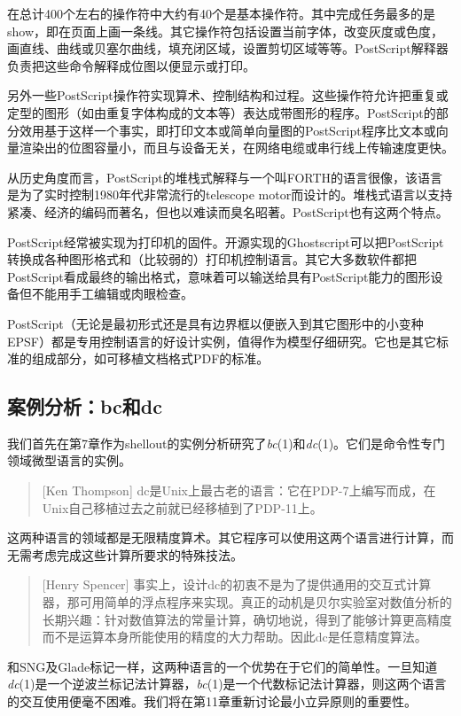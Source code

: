 \documentclass[12pt,oneside]{book}
\begin{document}
在总计400个左右的操作符中大约有40个是基本操作符。其中完成任务最多的是show，即在页面上画一条线。其它操作符包括设置当前字体，改变灰度或色度，画直线、曲线或贝塞尔曲线，填充闭区域，设置剪切区域等等。PostScript解释器负责把这些命令解释成位图以便显示或打印。

另外一些PostScript操作符实现算术、控制结构和过程。这些操作符允许把重复或定型的图形（如由重复字体构成的文本等）表达成带图形的程序。PostScript的部分效用基于这样一个事实，即打印文本或简单向量图的PostScript程序比文本或向量渲染出的位图容量小，而且与设备无关，在网络电缆或串行线上传输速度更快。

从历史角度而言，PostScript的堆栈式解释与一个叫FORTH的语言很像，该语言是为了实时控制1980年代非常流行的telescope motor而设计的。堆栈式语言以支持紧凑、经济的编码而著名，但也以难读而臭名昭著。PostScript也有这两个特点。

PostScript经常被实现为打印机的固件。开源实现的Ghostscript可以把PostScript转换成各种图形格式和（比较弱的）打印机控制语言。其它大多数软件都把PostScript看成最终的输出格式，意味着可以输送给具有PostScript能力的图形设备但不能用手工编辑或肉眼检查。

PostScript（无论是最初形式还是具有边界框以便嵌入到其它图形中的小变种EPSF）都是专用控制语言的好设计实例，值得作为模型仔细研究。它也是其它标准的组成部分，如可移植文档格式PDF的标准。


\subsection{案例分析：bc和dc}
我们首先在第7章作为shellout的实例分析研究了\textit{bc}(1)和\textit{dc}(1)。它们是命令性专门领域微型语言的实例。
\begin{quote}[Ken Thompson]
dc是Unix上最古老的语言：它在PDP-7上编写而成，在Unix自己移植过去之前就已经移植到了PDP-11上。
\end{quote}

这两种语言的领域都是无限精度算术。其它程序可以使用这两个语言进行计算，而无需考虑完成这些计算所要求的特殊技法。

\begin{quote}[Henry Spencer]
事实上，设计dc的初衷不是为了提供通用的交互式计算器，那可用简单的浮点程序来实现。真正的动机是贝尔实验室对数值分析的长期兴趣：针对数值算法的常量计算，确切地说，得到了能够计算更高精度而不是运算本身所能使用的精度的大力帮助。因此dc是任意精度算法。
\end{quote}

和SNG及Glade标记一样，这两种语言的一个优势在于它们的简单性。一旦知道\textit{dc}(1)是一个逆波兰标记法计算器，\textit{bc}(1)是一个代数标记法计算器，则这两个语言的交互使用便毫不困难。我们将在第11章重新讨论最小立异原则的重要性。
\end{document}
